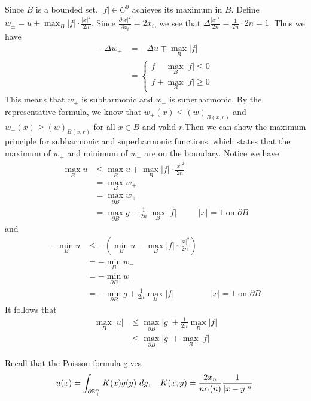 \documentclass[12pt]{article}
\begin{document}
\newpage
\begin{problem}[3]
Since $B$ is a bounded set, $ |f| \in C^{0}$ achieves its maximum in  $ \overline{B}$. Define $ w_{\pm} = u \pm \max_{B} |f| \cdot  \frac{|x|^2}{ 2n}$. Since $ \frac{\partial |x|^2}{\partial x_i} = 2x_i$, we see that $ \Delta \frac{|x|^2}{2n } = \frac{1}{2n} \cdot 2n =1 $. Thus we have
\begin{align*}
	-\Delta w_{\pm} &= -\Delta u \mp \max_{B} |f|\\
	&= \begin{cases}
		f- \max_{B}|f| \leq 0\\
		f + \max_{B}|f| \geq 0
	\end{cases} 
\end{align*}
This means that $ w_+$ is subharmonic and  $ w_{-}$ is superharmonic. By the representative formula, we know that $ w_+(x) \leq (w)_{B(x,r)}$ and $ w_{-}(x) \geq (w)_{B(x,r)}$ for all $ x \in B$ and valid $ r$.Then we can show the maximum principle for subharmonic and superharmonic functions, which states that the maximum of $ w_+$ and minimum of $ w_{-}$ are on the boundary. Notice we have
\begin{align*}
	\max_B u &\leq \max_B u + \max_B |f| \cdot \frac{|x|^2}{2n }\\
	&= \max_{B} w_+ \\
	&= \max_{\partial B} w_+  \\
	&= \max_{\partial B} g + \frac{1}{2n}\max_{B} |f| && |x|=1 \text{ on }\partial B 
\end{align*}
and
\begin{align*}
	-\min_{B} u &\leq - \left(  \min_{B} u - \max_{B}|f| \cdot  \frac{|x|^2}{2n } \right)  \\
	&= - \min_B w_{-} \\
	&= - \min_{\partial B}w_{-} \\
	&= - \min_{ \partial B}g + \frac{1}{2n} \max_{B}|f| && |x|=1 \text{ on } \partial B 
\end{align*}
It follows that
\begin{align*}
	\max_B |u| &\leq \max_{\partial B} |g| + \frac{1}{2n} \max_B |f| \\
	&\leq \max_{ \partial B} |g| + \max_B |f|  
\end{align*}
\newpage
\begin{problem}[4]
Recall that the Poisson formula gives
\begin{align*}
	u(x) = \int_{\partial \mathbb{R}_+^{n}} K(x)g(y)\ dy, \quad K(x,y) = \frac{2x_n}{ n \alpha(n)} \frac{1}{|x-y|^{n}}.
\end{align*}

\end{problem}
\end{problem}
\end{document}
